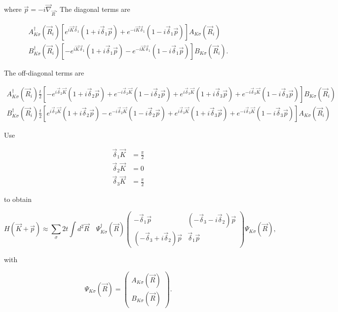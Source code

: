 \documentclass[../../../main.tex]{subfiles}
\begin{document}
where $\vec{p} = -i\vec{\nabla}_{\vec{R}}$. The diagonal terms are 

\begin{gather}
	A^\dagger_{K\sigma}(\vec{R}_i)\left[e^{i\vec{K}\vec{\delta}_1}(1+i\vec{\delta}_1\vec{p}) + e^{-i\vec{K}\vec{\delta}_1}(1-i\vec{\delta}_1\vec{p})\right]A_{K\sigma}(\vec{R}_i) \label{mael11}\\
	B^\dagger_{K\sigma}(\vec{R}_i)\left[-e^{i\vec{K}\vec{\delta}_1}(1+i\vec{\delta}_1\vec{p}) - e^{-i\vec{K}\vec{\delta}_1}(1-i\vec{\delta}_1\vec{p})\right]B_{K\sigma}(\vec{R}_i).
\end{gather}

The off-diagonal terms are 

\begin{gather}
	A^\dagger_{K\sigma}(\vec{R}_i)\frac{t}{2}\left[-e^{i\vec{\delta}_2\vec{K}}(1+i\vec{\delta}_2\vec{p}) + e^{-i\vec{\delta}_2\vec{K}}(1-i\vec{\delta}_2\vec{p}) + e^{i\vec{\delta}_3\vec{K}}(1+i\vec{\delta}_3\vec{p}) + e^{-i\vec{\delta}_3\vec{K}}(1-i\vec{\delta}_3\vec{p})\right]B_{K\sigma}(\vec{R}_i) \\
B^\dagger_{K\sigma}(\vec{R}_i)\frac{t}{2}\left[e^{i\vec{\delta}_2\vec{K}}(1+i\vec{\delta}_2\vec{p}) - e^{-i\vec{\delta}_2\vec{K}}(1-i\vec{\delta}_2\vec{p}) + e^{i\vec{\delta}_3\vec{K}}(1+i\vec{\delta}_3\vec{p}) + e^{-i\vec{\delta}_3\vec{K}}(1-i\vec{\delta}_3\vec{p})\right]A_{K\sigma}(\vec{R}_i)\end{gather}

Use 

\begin{align}
	\vec{\delta}_1\vec{K} &= \frac{\pi}{2} \\
	\vec{\delta}_2\vec{K} &=0 \\
	\vec{\delta}_3\vec{K} &= \frac{\pi}{2}
\end{align}

to obtain 

\begin{equation}
	H(\vec{K}+\vec{p}) \approx \sum_\sigma 2t \int d^2\vec{R} \quad
	\Psi^\dagger_{K\sigma}(\vec{R})
	\begin{pmatrix}
		-\vec{\delta}_1\vec{p} & \left(-\vec{\delta}_3-i\vec{\delta}_2\right)\vec{p} \\
		\left(-\vec{\delta}_3 + i \vec{\delta}_2\right)\vec{p} & \vec{\delta}_1\vec{p}
	\end{pmatrix}
	\Psi_{K\sigma}(\vec{R}),
\end{equation}

with 

\begin{equation}
	\Psi_{K\sigma}(\vec{R}) =
	\begin{pmatrix}
		A_{K\sigma}(\vec{R}) \\
		B_{K\sigma}(\vec{R})
	\end{pmatrix}.
\end{equation}
\end{document}
